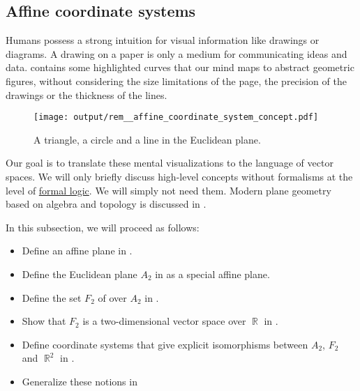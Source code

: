 \subsection{Affine coordinate systems}\label{subsec:affine_coordinate_system}

\begin{remark}\label{rem:affine_coordinate_system_concept}
  Humans possess a strong intuition for visual information like drawings or diagrams. A drawing on a paper is only a medium for communicating ideas and data.  contains some highlighted curves that our mind maps to abstract geometric figures, without considering the size limitations of the page, the precision of the drawings or the thickness of the lines.

  \begin{figure}[!ht]
    \centering
    \texttt{[image: output/rem\_\_affine\_coordinate\_system\_concept.pdf]}
    \caption{A triangle, a circle and a line in the Euclidean plane.}\label{fig:rem:affine_coordinate_system_concept/figures}
  \end{figure}

  Our goal is to translate these mental visualizations to the language of vector spaces. We will only briefly discuss high-level concepts without formalisms at the level of \hyperref[sec:mathematical_logic]{formal logic}. We will simply not need them. Modern plane geometry based on algebra and topology is discussed in .

  In this subsection, we will proceed as follows:
  \begin{itemize}
    \item Define an affine plane in .
    \item Define the Euclidean plane \( A_2 \) in  as a special affine plane.
    \item Define the set \( F_2 \) of  over \( A_2 \) in .
    \item Show that \( F_2 \) is a two-dimensional vector space over \( \BbbR \) in .
    \item Define coordinate systems that give explicit isomorphisms between \( A_2 \), \( F_2 \) and \( \BbbR^2 \) in .
    \item Generalize these notions in 
  \end{itemize}
\end{remark}

